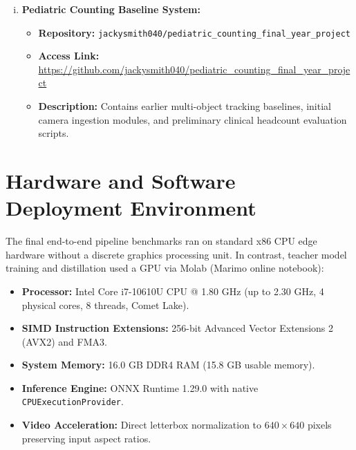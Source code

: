 \begin{enumerate}[(i)]
    \item \textbf{Pediatric Counting Baseline System:}
    \begin{itemize}
        \item \textbf{Repository:} \nolinkurl{jackysmith040/pediatric_counting_final_year_project}
        \item \textbf{Access Link:} \url{https://github.com/jackysmith040/pediatric_counting_final_year_project}
        \item \textbf{Description:} Contains earlier multi-object tracking baselines, initial camera ingestion modules, and preliminary clinical headcount evaluation scripts.
    \end{itemize}
\end{enumerate}

\section{Hardware and Software Deployment Environment}
The final end-to-end pipeline benchmarks ran on standard x86 CPU edge hardware without a discrete graphics processing unit. In contrast, teacher model training and distillation used a GPU via Molab (Marimo online notebook):
\begin{itemize}
    \item \textbf{Processor:} Intel Core i7-10610U CPU @ 1.80 GHz (up to 2.30 GHz, 4 physical cores, 8 threads, Comet Lake).
    \item \textbf{SIMD Instruction Extensions:} 256-bit Advanced Vector Extensions 2 (AVX2) and FMA3.
    \item \textbf{System Memory:} 16.0 GB DDR4 RAM (15.8 GB usable memory).
    \item \textbf{Inference Engine:} ONNX Runtime 1.29.0 with native \texttt{CPUExecutionProvider}.
    \item \textbf{Video Acceleration:} Direct letterbox normalization to $640 \times 640$ pixels preserving input aspect ratios.
\end{itemize}
